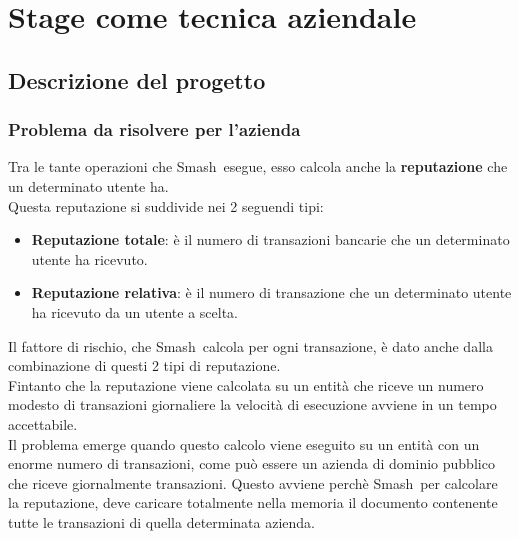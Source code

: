 
\chapter{Stage come tecnica aziendale}
\label{cap:tecnica-stage}

\section{Descrizione del progetto}
\subsection{Problema da risolvere per l'azienda}
Tra le tante operazioni che Smash\textregistered\ esegue, esso calcola anche la \textbf{reputazione} che un determinato utente ha.\\
Questa reputazione si suddivide nei 2 seguendi tipi:
\begin{itemize}
\item{\textbf{Reputazione totale}:} è il numero di transazioni bancarie che un determinato utente ha ricevuto.
\item{\textbf{Reputazione relativa}:} è il numero di transazione che un determinato utente ha ricevuto da un utente a scelta.
\end{itemize}
Il fattore di rischio, che Smash\textregistered\ calcola per ogni transazione, è dato anche dalla combinazione di questi 2 tipi di reputazione.\\
Fintanto che la reputazione viene calcolata su un entità che riceve un numero modesto di transazioni giornaliere la velocità di esecuzione avviene in un tempo accettabile. 
\\Il problema emerge quando questo calcolo viene eseguito su un entità con un enorme numero di transazioni, come può essere un azienda di dominio pubblico che riceve giornalmente transazioni. Questo avviene perchè Smash\textregistered\, per calcolare la reputazione, deve caricare totalmente nella memoria il documento contenente tutte le transazioni di quella determinata azienda.
